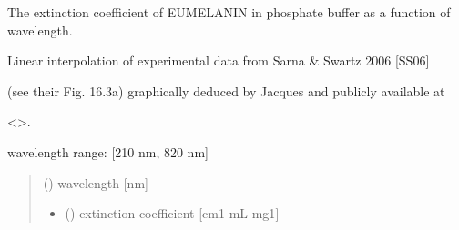 \documentclass[letterpaper,10pt,english]{sphinxmanual}
\begin{document}
\begin{fulllineitems}
\label{\detokenize{03_absorption_coefficient:skinoptics.absorption_coefficient.ext_eum_Sarna}}
\pysigstartsignatures
{}
\pysigstopsignatures
\begin{DUlineblock}{0em}
\item[] The extinction coefficient of EUMELANIN in phosphate buffer as a function of wavelength.
\item[] Linear interpolation of experimental data from Sarna \& Swartz 2006 {[}SS06{]}
\item[] (see their Fig. 16.3\sphinxhyphen{}a) graphically deduced by Jacques and publicly available at
\item[] \textless{}\textgreater{}.
\end{DUlineblock}

\begin{DUlineblock}{0em}
\item[] wavelength range: {[}210 nm, 820 nm{]}
\end{DUlineblock}
\begin{quote}\begin{description}
\sphinxAtStartPar
{} () \textendash{} wavelength {[}nm{]}

\sphinxAtStartPar
\begin{itemize}
\item {} 
\sphinxAtStartPar
{} () \textendash{} extinction coefficient {[}cm\sphinxhyphen{}1 mL mg\sphinxhyphen{}1{]}

\end{itemize}


\end{description}\end{quote}

\end{fulllineitems}

\end{document}
